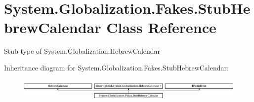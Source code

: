 \hypertarget{class_system_1_1_globalization_1_1_fakes_1_1_stub_hebrew_calendar}{\section{System.\-Globalization.\-Fakes.\-Stub\-Hebrew\-Calendar Class Reference}
\label{class_system_1_1_globalization_1_1_fakes_1_1_stub_hebrew_calendar}
}


Stub type of System.\-Globalization.\-Hebrew\-Calendar 


Inheritance diagram for System.\-Globalization.\-Fakes.\-Stub\-Hebrew\-Calendar\-:\begin{figure}[H]
\begin{center}
\leavevmode
\includegraphics[height=1.145194cm]{class_system_1_1_globalization_1_1_fakes_1_1_stub_hebrew_calendar}
\end{center}
\end{figure}
